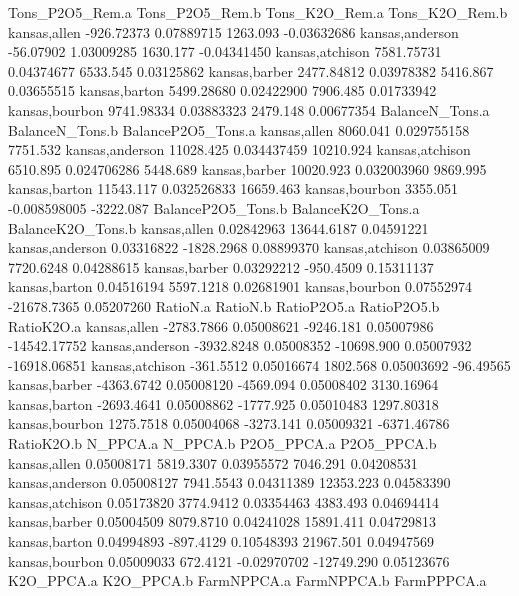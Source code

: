 \documentclass{report}
\begin{document}
\begin{Schunk}
\begin{Soutput}
                Tons_P2O5_Rem.a Tons_P2O5_Rem.b Tons_K2O_Rem.a Tons_K2O_Rem.b
kansas,allen         -926.72373      0.07889715       1263.093    -0.03632686
kansas,anderson       -56.07902      1.03009285       1630.177    -0.04341450
kansas,atchison      7581.75731      0.04374677       6533.545     0.03125862
kansas,barber        2477.84812      0.03978382       5416.867     0.03655515
kansas,barton        5499.28680      0.02422900       7906.485     0.01733942
kansas,bourbon       9741.98334      0.03883323       2479.148     0.00677354
                BalanceN_Tons.a BalanceN_Tons.b BalanceP2O5_Tons.a
kansas,allen           8060.041     0.029755158           7751.532
kansas,anderson       11028.425     0.034437459          10210.924
kansas,atchison        6510.895     0.024706286           5448.689
kansas,barber         10020.923     0.032003960           9869.995
kansas,barton         11543.117     0.032526833          16659.463
kansas,bourbon         3355.051    -0.008598005          -3222.087
                BalanceP2O5_Tons.b BalanceK2O_Tons.a BalanceK2O_Tons.b
kansas,allen            0.02842963        13644.6187        0.04591221
kansas,anderson         0.03316822        -1828.2968        0.08899370
kansas,atchison         0.03865009         7720.6248        0.04288615
kansas,barber           0.03292212         -950.4509        0.15311137
kansas,barton           0.04516194         5597.1218        0.02681901
kansas,bourbon          0.07552974       -21678.7365        0.05207260
                  RatioN.a   RatioN.b RatioP2O5.a RatioP2O5.b   RatioK2O.a
kansas,allen    -2783.7866 0.05008621   -9246.181  0.05007986 -14542.17752
kansas,anderson -3932.8248 0.05008352  -10698.900  0.05007932 -16918.06851
kansas,atchison  -361.5512 0.05016674    1802.568  0.05003692    -96.49565
kansas,barber   -4363.6742 0.05008120   -4569.094  0.05008402   3130.16964
kansas,barton   -2693.4641 0.05008862   -1777.925  0.05010483   1297.80318
kansas,bourbon   1275.7518 0.05004068   -3273.141  0.05009321  -6371.46786
                RatioK2O.b  N_PPCA.a    N_PPCA.b P2O5_PPCA.a P2O5_PPCA.b
kansas,allen    0.05008171 5819.3307  0.03955572    7046.291  0.04208531
kansas,anderson 0.05008127 7941.5543  0.04311389   12353.223  0.04583390
kansas,atchison 0.05173820 3774.9412  0.03354463    4383.493  0.04694414
kansas,barber   0.05004509 8079.8710  0.04241028   15891.411  0.04729813
kansas,barton   0.04994893 -897.4129  0.10548393   21967.501  0.04947569
kansas,bourbon  0.05009033  672.4121 -0.02970702  -12749.290  0.05123676
                K2O_PPCA.a K2O_PPCA.b FarmNPPCA.a FarmNPPCA.b FarmPPPCA.a

\end{Soutput}
\end{Schunk}
\end{document}
